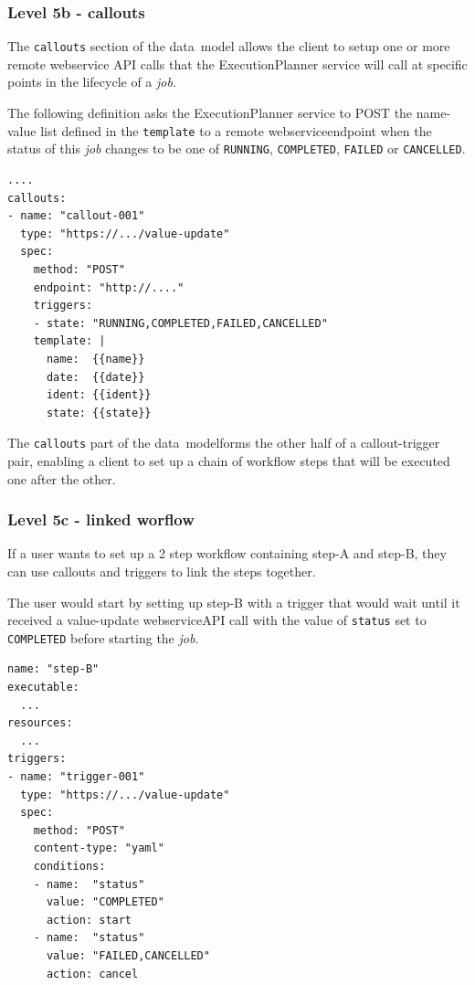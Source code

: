 \documentclass[11pt,a4paper]{ivoa}
\newcommand{\datamodel} {data~model}
\newcommand{\webservice} {webservice}
\newcommand{\execplanner} {ExecutionPlanner}
\newcommand{\codeword}[1] {\texttt{#1}}
\newcommand{\job} {\textit{job}}
\begin{document}
\subsubsection{Level 5b - callouts}
\label{callouts}

The \codeword{callouts} section of the \datamodel{} allows the client to setup one or more remote
\webservice{} API calls that the \execplanner{} service will call at specific points in the lifecycle
of a \job{}.

The following definition asks the \execplanner{} service to POST the name-value list defined in the
\codeword{template} to a remote \webservice endpoint when the status of this \job{} changes to be one
of \codeword{RUNNING}, \codeword{COMPLETED}, \codeword{FAILED} or \codeword{CANCELLED}.

\begin{lstlisting}[]
....
callouts:
- name: "callout-001"
  type: "https://.../value-update"
  spec:
    method: "POST"
    endpoint: "http://...."
    triggers:
    - state: "RUNNING,COMPLETED,FAILED,CANCELLED"
    template: |
      name:  {{name}}
      date:  {{date}}
      ident: {{ident}}
      state: {{state}}
\end{lstlisting}

The \codeword{callouts} part of the \datamodel forms the other half of a callout-trigger pair,
enabling a client to set up a chain of workflow steps that will be executed one after the other.

\subsubsection{Level 5c - linked worflow}
\label{linked-worflow}

If a user wants to set up a 2 step workflow containing step-A and step-B,
they can use callouts and triggers to link the steps together.

The user would start by setting up step-B with a trigger that would wait until it received
a value-update \webservice API call with the value of \codeword{status} set to
\codeword{COMPLETED} before starting the \job{}.

\begin{lstlisting}[]
name: "step-B"
executable:
  ...
resources:
  ...
triggers:
- name: "trigger-001"
  type: "https://.../value-update"
  spec:
    method: "POST"
    content-type: "yaml"
    conditions:
    - name:  "status"
      value: "COMPLETED"
      action: start
    - name:  "status"
      value: "FAILED,CANCELLED"
      action: cancel
\end{lstlisting}
\end{document}
